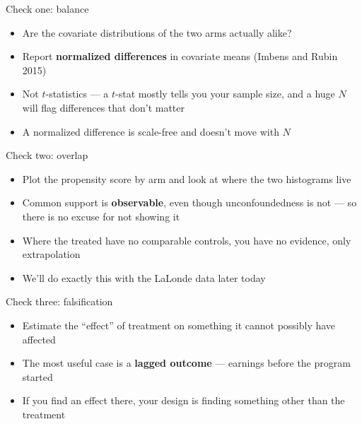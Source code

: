 \documentclass{beamer}
\newcommand{\highlight}[1]{\textcolor{accent}{\textbf{#1}}}
\begin{document}
\begin{frame}{Check one: balance}

\begin{itemize}
\item Are the covariate distributions of the two arms actually alike?
\item Report \highlight{normalized differences} in covariate means (Imbens and Rubin 2015)
\end{itemize}

\vspace{0.8em}

\begin{itemize}
\item Not $t$-statistics --- a $t$-stat mostly tells you your sample size, and a huge $N$ will flag differences that don't matter
\item A normalized difference is scale-free and doesn't move with $N$
\end{itemize}

\end{frame}


\begin{frame}{Check two: overlap}

\begin{itemize}
\item Plot the propensity score by arm and look at where the two histograms live
\item Common support is \highlight{observable}, even though unconfoundedness is not --- so there is no excuse for not showing it
\end{itemize}

\vspace{0.8em}

\begin{itemize}
\item Where the treated have no comparable controls, you have no evidence, only extrapolation
\item We'll do exactly this with the LaLonde data later today
\end{itemize}

\end{frame}


\begin{frame}{Check three: falsification}

\begin{itemize}
\item Estimate the ``effect'' of treatment on something it cannot possibly have affected
\item The most useful case is a \highlight{lagged outcome} --- earnings before the program started
\item If you find an effect there, your design is finding something other than the treatment
\end{itemize}

\end{frame}
\end{document}
